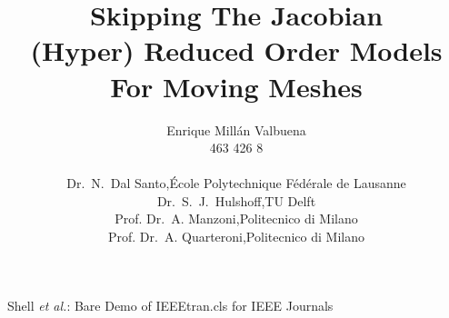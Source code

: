 \documentclass[a4paper, technote,compsoc]{IEEEtran}
\begin{document}


\onecolumn

\title{Skipping The Jacobian \\[5mm] \large{(Hyper) Reduced Order Models For Moving Meshes}}

\author{Enrique Millán Valbuena \\ \normalsize{463 426 8}
\\[5mm]

\begin{tabular}{ll}
    Dr.\ N.\ Dal Santo,       & École Polytechnique Fédérale de Lausanne \\
    Dr.\ S.\ J.\ Hulshoff,    & TU Delft \\
    Prof. Dr.\ A. Manzoni,    & Politecnico di Milano \\
    Prof. Dr.\ A. Quarteroni, & Politecnico di Milano \\[5mm]
\end{tabular}
}%
        
{Shell \MakeLowercase{\textit{et al.}}: Bare Demo of IEEEtran.cls for IEEE Journals}

\maketitle
\end{document}
